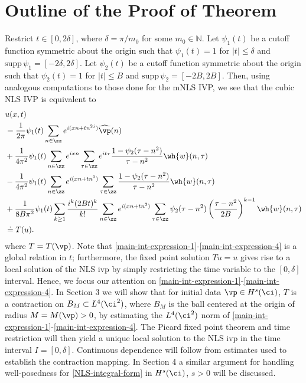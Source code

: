 \section{Outline of the Proof of Theorem}
%
%
%
%
%
%
%
Restrict $t \in [0, 2\delta]$, where $\delta = \pi/m_0$ for some $m_0 \in 
\mathbb{N}$. Let $\psi_1(t)$ be a cutoff function symmetric about the 
origin such that $\psi_1(t) = 1$ for $|t| \le \delta$ and $\text{supp} \, \psi_1 
= 
[-2\delta, 2\delta ]$. Let $\psi_2(t)$ be a cutoff function symmetric about the origin such that 
$\psi_2(t) = 1$ for $|t| \le B$ and $\text{supp} \, \psi_2 = 
[-2B, 2 B]$.
Then, using analogous computations to those done for the mNLS IVP, we see that the cubic NLS IVP is equivalent to 
%
\begin{align}
	\label{main-int-expression-1}
	& u(x, t) \notag
		\\
		& = \frac{1}{2 \pi} \psi_1(t) \sum_{n \in \zz} e^{i(xn + tn^{2 
		j})} \widehat{\vp}(n) 
		\\
		\label{main-int-expression-2}
		& + \frac{1}{4 \pi^2} \psi_1(t) \sum_{n \in \zz} e^{ixn} \sum_{\tau \in \zz} 
		e^{it \tau} \frac{ 1 - \psi_2(\tau - n^2) 
		}{\tau - n^2} \wh{w}(n, \tau) 
		\\
		\label{main-int-expression-3}
		& - \frac{1}{4 \pi^2} \psi_1(t) \sum_{n \in \zz} e^{i(xn + 
		tn^2)}
		\sum_{\tau \in \zz} \frac{1- \psi_2(\tau - n^2)}{\tau - n^2} \wh{w}(n, \tau) 
		\\
		\label{main-int-expression-4}
		& + \frac{1}{8 B \pi^2} \psi_1(t) \sum_{k \ge 1} \frac{i^k (2Bt)^k}{k!}
		\sum_{n \in \zz} e^{i(xn + tn^2 )}
		\sum_{\tau \in \zz}	\psi_2 (\tau - n^2) \left(\frac{\tau - 
		n^2}{2B} \right)^{k -1} \wh{w}(n, \tau) 
		\\
		& \doteq T(u). \notag
\end{align}
where $T = T(\vp)$. Note that 
\eqref{main-int-expression-1}-\eqref{main-int-expression-4} is a global 
relation in $t$; furthermore, the fixed point solution $Tu=u$ gives rise to a 
local solution of the NLS ivp by simply restricting the time 
variable to 
the $[0, \delta]$ interval. Hence, we focus our attention on 
\eqref{main-int-expression-1}-\eqref{main-int-expression-4}. In 
Section 3 we will show that for initial data $\vp \in H^s(\ci)$, $T$ is 
a contraction on $B_M 
\subset L^4(\ci^2)$, where $B_M$ is the ball centered at 
the origin of radius $M = M(\vp) > 0$, by estimating the $L^4(\ci^2)$
norm of 
\eqref{main-int-expression-1}-\eqref{main-int-expression-4}. The Picard 
fixed point theorem and time restriction will
then yield a unique local solution to the NLS ivp in the time interval
$I = [0, \delta]$. Continuous 
dependence will follow from estimates used to establish the contraction 
mapping.  In Section 4 a similar argument for handling well-posedness for 
\eqref{NLS-integral-form} in $H^s(\ci)$, $s > 0$ will be discussed.
%
%
%
%
%
%
%
%
%
%
